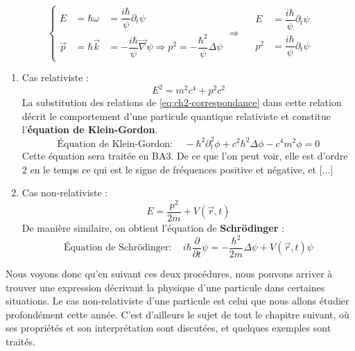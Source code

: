 \documentclass[12pt, a4paper]{book}
\begin{document}
\begin{enumerate}[label =  (\alph*)]
\begin{equation} \label{eq:ch2-correspondance}
\left\{ \begin{array}{lll}
E &= \hbar \omega &= \dfrac{i\hbar}{\psi} \partial_t \psi \\
\vec p &= \hbar \vec k &= -\dfrac{i\hbar}{\psi} \vec \nabla \psi \Rightarrow p^2 = -\dfrac{\hbar ^2}{\psi} \Delta \psi
\end{array} \right. \Longrightarrow \quad \boxed{\begin{array}{ll}
E &=\dfrac{i\hbar}{\psi} \partial_t \psi \\
p^2 &=  \dfrac{i\hbar}{\psi} \partial_t \psi
\end{array}}
\end{equation}

\begin{enumerate}[label = \roman*)]
\item Cas relativiste : 
$$E^2 = m^2 c^4 + p^2 c^2$$
La substitution des relations de \eqref{eq:ch2-correspondance} dans cette relation décrit le comportement d'une particule quantique relativiste et constitue l'\textbf{équation de Klein-Gordon}.
\begin{equation} \label{eq:dirac}
\boxed{\text{Équation de Klein-Gordon} : \quad -\hbar ^2 \partial_t ^2 \phi + c^2 \hbar ^2 \Delta \phi - c^4 m^2 \phi = 0}
\end{equation}
Cette équation sera traitée en BA3. De ce que l'on peut voir, elle est d'ordre 2 en le temps ce qui est le signe de fréquences positive et négative, et [...]
\item Cas non-relativiste :
$$E = \dfrac{p^2}{2m} + V(\vec r, t)$$
De manière similaire, on obtient l'équation de \textbf{Schrödinger} :
\begin{equation} 
\boxed{\text{Équation de Schrödinger} : \quad
i\hbar \dfrac{\partial}{\partial t} \psi = -\dfrac{\hbar ^2}{2m} \Delta \psi + V(\vec r, t) \psi}
\end{equation}

\end{enumerate}
\end{enumerate}
Nous voyons donc qu'en suivant ces deux procédures, nous pouvons arriver à trouver une expression décrivant la physique d'une particule dans certaines situations. Le cas non-relativiste d'une particule est celui que nous allons étudier profondément cette année. C'est d'ailleurs le sujet de tout le chapitre suivant, où ses propriétés et son interprétation sont discutées, et quelques exemples sont traités.
\end{document}
